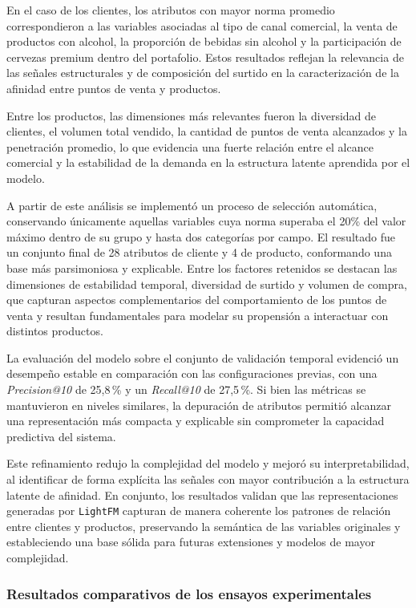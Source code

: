 En el caso de los clientes, los atributos con mayor norma promedio correspondieron a las variables asociadas al tipo de canal comercial, la venta de productos con alcohol, la proporción de bebidas sin alcohol y la participación de cervezas premium dentro del portafolio. Estos resultados reflejan la relevancia de las señales estructurales y de composición del surtido en la caracterización de la afinidad entre puntos de venta y productos. 

Entre los productos, las dimensiones más relevantes fueron la diversidad de clientes, el volumen total vendido, la cantidad de puntos de venta alcanzados y la penetración promedio, lo que evidencia una fuerte relación entre el alcance comercial y la estabilidad de la demanda en la estructura latente aprendida por el modelo.

A partir de este análisis se implementó un proceso de selección automática, conservando únicamente aquellas variables cuya norma superaba el 20\% del valor máximo dentro de su grupo y hasta dos categorías por campo. El resultado fue un conjunto final de 28 atributos de cliente y 4 de producto, conformando una base más parsimoniosa y explicable. Entre los factores retenidos se destacan las dimensiones de estabilidad temporal, diversidad de surtido y volumen de compra, que capturan aspectos complementarios del comportamiento de los puntos de venta y resultan fundamentales para modelar su propensión a interactuar con distintos productos.

La evaluación del modelo sobre el conjunto de validación temporal evidenció un desempeño estable en comparación con las configuraciones previas, con una \textit{Precision@10} de 25{,}8\,\% y un \textit{Recall@10} de 27{,}5\,\%. Si bien las métricas se mantuvieron en niveles similares, la depuración de atributos permitió alcanzar una representación más compacta y explicable sin comprometer la capacidad predictiva del sistema. 

Este refinamiento redujo la complejidad del modelo y mejoró su interpretabilidad, al identificar de forma explícita las señales con mayor contribución a la estructura latente de afinidad. En conjunto, los resultados validan que las representaciones generadas por \texttt{LightFM} capturan de manera coherente los patrones de relación entre clientes y productos, preservando la semántica de las variables originales y estableciendo una base sólida para futuras extensiones y modelos de mayor complejidad.

\subsubsection{Resultados comparativos de los ensayos experimentales}

